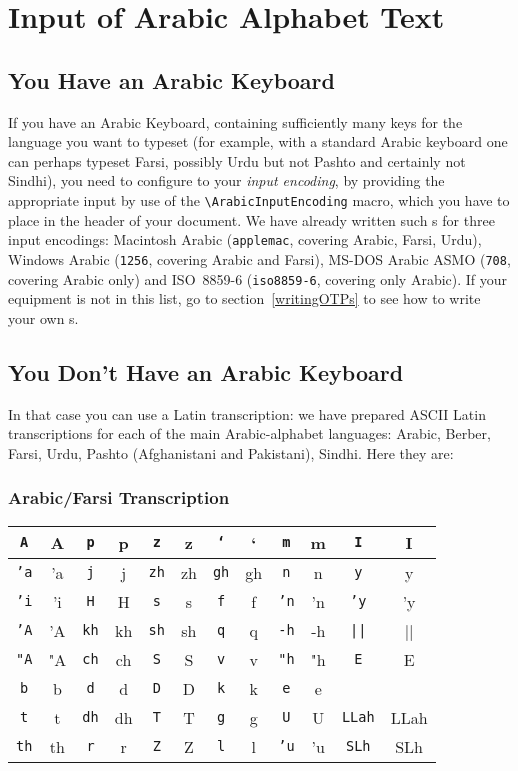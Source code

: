 \documentclass[a4paper,11pt]{article}
\def\shortarab#1{{\pushocplist\ArabicOCP\fontfamily{omarb}\selectfont#1\popocplist}}
\def\tl#1#2#3#4#5#6{\hline\rule[-5pt]{0pt}{14pt}\texttt{#1}&\shortarab{#1}&\texttt{#2}&\shortarab{#2}&\texttt{#3}&\shortarab{#3}&
\texttt{#4}&\shortarab{#4}&\texttt{#5}&\shortarab{#5}&\texttt{#6}&\shortarab{#6}\\}
\begin{document}
\section{Input of Arabic Alphabet Text}

\subsection{You Have an Arabic Keyboard}

If you have an Arabic Keyboard, containing sufficiently many keys for
the language you want to typeset (for example, with a standard Arabic
keyboard one can perhaps typeset Farsi, possibly Urdu but not Pashto
and certainly not Sindhi), you need to configure \OMEGA{} to your
\emph{input encoding}, by providing the appropriate input \OTP{} by
use of the \verb=\ArabicInputEncoding= macro, which you have to place
in the header of your document. We have already written such \OTP{}s
for three input encodings: Macintosh Arabic (\texttt{applemac},
covering Arabic, Farsi, Urdu), Windows Arabic (\texttt{1256}, covering
Arabic and Farsi), MS-DOS Arabic ASMO (\texttt{708}, covering Arabic
only) and ISO~8859-6 (\texttt{iso8859-6}, covering only Arabic).  If
your equipment is not in this list, go to section~\ref{writingOTPs} to
see how to write your own \OTP{}s.

\subsection{You Don't Have an Arabic Keyboard}

In that case you can use a Latin transcription: we have prepared ASCII
Latin transcriptions for each of the main Arabic-alphabet languages:
Arabic, Berber, Farsi, Urdu, Pashto (Afghanistani and Pakistani),
Sindhi. Here they are:

\subsubsection{Arabic/Farsi Transcription}\label{arabtrans}

\begin{center}
\begin{tabular}{|c|c||c|c||c|c||c|c||c|c||c|c|}
\tl{A}{p}{z}{`}{m}{I}
\tl{'a}{j}{zh}{gh}{n}{y}
\tl{'i}{H}{s}{f}{'n}{'y}
\tl{'A}{kh}{sh}{q}{-h}{||}
\tl{"A}{ch}{S}{v}{"h}{E}
\tl{b}{d}{D}{k}{e}{}
\tl{t}{dh}{T}{g}{U}{LLah}
\tl{th}{r}{Z}{l}{'u}{SLh}
\hline
\end{tabular}
\end{center}
\end{document}
